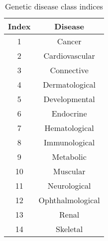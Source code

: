 \documentclass[runningheads,a4paper]{llncs}
\begin{document}
\begin{table*}[!htbp]
\vspace*{1cm}
\centering
\caption{Genetic disease class indices}
\label{table:results1}
\setlength{\tabcolsep}{1 cm}
\begin{tabular}{|c|c|}
\hline
Index & Disease \\
\hline
1 & Cancer \\
2 & Cardiovascular \\
3 & Connective \\
4 & Dermatological \\
5 & Developmental \\
6 & Endocrine \\
7 & Hematological \\
8 & Immunological \\
9 & Metabolic \\
10 & Muscular \\
11 & Neurological \\ 
12 & Ophthalmological \\
13 & Renal \\
14 & Skeletal \\
\hline
\end{tabular}
\end{table*}
\newpage
\end{document}
